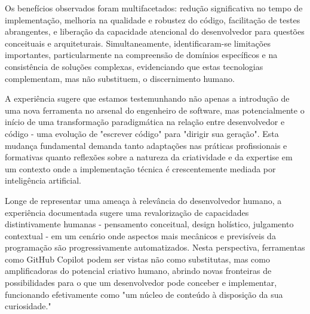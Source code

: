 \documentclass[12pt,a4paper]{article}
\begin{document}
Os benefícios observados foram multifacetados: redução significativa no tempo de implementação, melhoria na qualidade e robustez do código, facilitação de testes abrangentes, e liberação da capacidade atencional do desenvolvedor para questões conceituais e arquiteturais. Simultaneamente, identificaram-se limitações importantes, particularmente na compreensão de domínios específicos e na consistência de soluções complexas, evidenciando que estas tecnologias complementam, mas não substituem, o discernimento humano.

A experiência sugere que estamos testemunhando não apenas a introdução de uma nova ferramenta no arsenal do engenheiro de software, mas potencialmente o início de uma transformação paradigmática na relação entre desenvolvedor e código - uma evolução de "escrever código" para "dirigir sua geração". Esta mudança fundamental demanda tanto adaptações nas práticas profissionais e formativas quanto reflexões sobre a natureza da criatividade e da expertise em um contexto onde a implementação técnica é crescentemente mediada por inteligência artificial.

Longe de representar uma ameaça à relevância do desenvolvedor humano, a experiência documentada sugere uma revalorização de capacidades distintivamente humanas - pensamento conceitual, design holístico, julgamento contextual - em um cenário onde aspectos mais mecânicos e previsíveis da programação são progressivamente automatizados. Nesta perspectiva, ferramentas como GitHub Copilot podem ser vistas não como substitutas, mas como amplificadoras do potencial criativo humano, abrindo novas fronteiras de possibilidades para o que um desenvolvedor pode conceber e implementar, funcionando efetivamente como "um núcleo de conteúdo à disposição da sua curiosidade."
\end{document}
